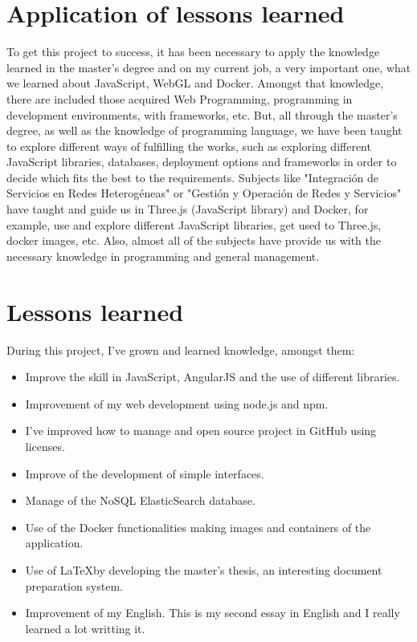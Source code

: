 \documentclass[a4paper, 12pt]{book}
\begin{document}
\section{Application of lessons learned}
\label{sec:aplication}

To get this project to success, it has been necessary to apply the knowledge learned in the master's degree and on my current job, a very important one, what we learned about JavaScript, WebGL and Docker. Amongst that knowledge, there are included those acquired Web Programming, programming in development environments, with frameworks, etc. But, all through the master's degree, as well as the knowledge of programming language, we have been taught to explore different ways of fulfilling the works, such as exploring different JavaScript libraries, databases, deployment options and frameworks in order to decide which fits the best to the requirements.
Subjects like "Integración de Servicios en Redes Heterogéneas" or "Gestión y Operación de Redes y Servicios" have taught and guide us in Three.js (JavaScript library) and Docker, for example, use and explore different JavaScript libraries, get used to Three.js, docker images, etc. Also, almost all of the subjects have provide us with the necessary knowledge in programming and general management.


\section{Lessons learned}
\label{sec:ll}

During this project, I’ve grown and learned knowledge, amongst them:

\begin{itemize}
\item Improve the skill in JavaScript, AngularJS and the use of different libraries.
\item Improvement of my web development using node.js and npm.
\item I've improved how to manage and open source project in GitHub using licenses.
\item Improve of the development of simple interfaces.
\item Manage of the NoSQL ElasticSearch database.
\item Use of the Docker functionalities making images and containers of the application.
\item Use of \LaTeX  by developing the master's thesis, an interesting document preparation system.
\item Improvement of my English. This is my second essay in English and I really learned a lot writting it.
\end{itemize}
\end{document}
